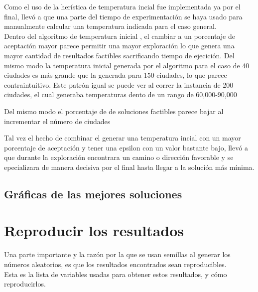 \documentclass[a4paper]{article}
\begin{document}
Como el uso de la her\'istica de temperatura incial fue implementada ya por el final, llev\'o a que una parte del tiempo de experimentaci\'on se haya usado para manualmente calcular una temperatura indicada para el caso general. \\

Dentro del algoritmo de temperatura inicial , el cambiar a un porcentaje de aceptaci\'on mayor parece permitir una mayor exploraci\'on lo que genera una mayor cantidad de resultados factibles sacrificando tiempo de ejecici\'on. Del mismo modo la temperatura inicial generada por el algoritmo para el caso de 40 ciudades es m\'as grande que la generada para 150 ciudades, lo que parece contraintuitivo. Este patr\'on igual se puede ver al correr la instancia de 200 ciudades, el cual generaba temperaturas dento de un rango de 60,000-90,000

Del mismo modo el porcentaje de de soluciones factibles parece bajar al incrementar el n\'umero de ciudades 

Tal vez el hecho de combinar el generar una temperatura incial con un mayor porcentaje de aceptaci\'on y tener una epsilon con un valor bastante bajo, llev\'o a que durante la exploraci\'on encontrara un camino o direcci\'on  favorable y se epecializara de manera decisiva por el final hasta llegar a la soluci\'on m\'as m\'inima. 

\subsection*{Gr\'aficas de las mejores soluciones}



\section*{Reproducir los resultados}
Una parte importante y la raz\'on por la que se usan semillas al generar los n\'umeros aleatorios, es que los resultados encontrados sean reproducibles.\\

Esta es la lista de variables usadas para obtener estos resultados, y c\'omo reproducirlos.
\end{document}
